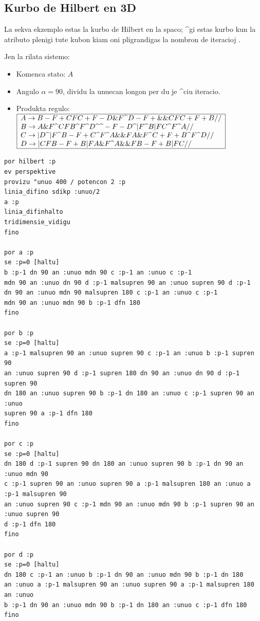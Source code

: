 \subsection {Kurbo de Hilbert en 3D}

La sekva ekzemplo estas la kurbo de Hilbert en la spaco; ^gi estas
kurbo kun la atributo plenigi tute kubon kiam oni pligrandigas la
nombron de iteracioj .

Jen la rilata sistemo:
\begin{itemize}
 \item Komenca stato: $A$
 \item Angulo $\alpha=90$\degre, dividu la unuecan longon per du je
   ^ciu iteracio.
 \item Produkta regulo: 
   $\begin{array}{|l|}
     \hline
     A\rightarrow B-F+CFC+F-D\&F \textrm{\textrm{\textasciicircum}} D-F+\&\&CFC+F+B// \\
     B\rightarrow A\&F\textrm{\textrm{\textasciicircum}} CFB\textrm{\textasciicircum} F 
     \textrm{\textasciicircum} D\textrm{\textasciicircum} \textrm{\textasciicircum}-F-D
     \textrm{\textasciicircum}|F\textrm{\textasciicircum} B|FC\textrm{\textasciicircum} 
     F\textrm{\textasciicircum} A// \\
     C\rightarrow|D\textrm{\textasciicircum}|F\textrm{\textasciicircum} B-F+C\textrm{\textasciicircum} 
     F\textrm{\textasciicircum} A\&\&FA\&F\textrm{\textasciicircum} C+F+B\textrm{\textasciicircum} F
     \textrm{\textasciicircum} D// \\
     D\rightarrow|CFB-F+B|FA\&F\textrm{\textasciicircum} A\&\&FB-F+B|FC// \\
     \hline
   \end{array}$
\end{itemize}
\begin{verbatim}
por hilbert :p
ev perspektive
provizu "unuo 400 / potencon 2 :p
linia_difino sdikp :unuo/2
a :p
linia_difinhalto
tridimensie_vidigu
fino

por a :p
se :p=0 [haltu]
b :p-1 dn 90 an :unuo mdn 90 c :p-1 an :unuo c :p-1
mdn 90 an :unuo dn 90 d :p-1 malsupren 90 an :unuo supren 90 d :p-1
dn 90 an :unuo mdn 90 malsupren 180 c :p-1 an :unuo c :p-1
mdn 90 an :unuo mdn 90 b :p-1 dfn 180
fino

por b :p
se :p=0 [haltu]
a :p-1 malsupren 90 an :unuo supren 90 c :p-1 an :unuo b :p-1 supren 90 
an :unuo supren 90 d :p-1 supren 180 dn 90 an :unuo dn 90 d :p-1 supren 90 
dn 180 an :unuo supren 90 b :p-1 dn 180 an :unuo c :p-1 supren 90 an :unuo
supren 90 a :p-1 dfn 180 
fino

por c :p
se :p=0 [haltu]
dn 180 d :p-1 supren 90 dn 180 an :unuo supren 90 b :p-1 dn 90 an :unuo mdn 90 
c :p-1 supren 90 an :unuo supren 90 a :p-1 malsupren 180 an :unuo a :p-1 malsupren 90 
an :unuo supren 90 c :p-1 mdn 90 an :unuo mdn 90 b :p-1 supren 90 an :unuo supren 90 
d :p-1 dfn 180 
fino

por d :p
se :p=0 [haltu]
dn 180 c :p-1 an :unuo b :p-1 dn 90 an :unuo mdn 90 b :p-1 dn 180
an :unuo a :p-1 malsupren 90 an :unuo supren 90 a :p-1 malsupren 180 an :unuo
b :p-1 dn 90 an :unuo mdn 90 b :p-1 dn 180 an :unuo c :p-1 dfn 180
fino
\end{verbatim}
